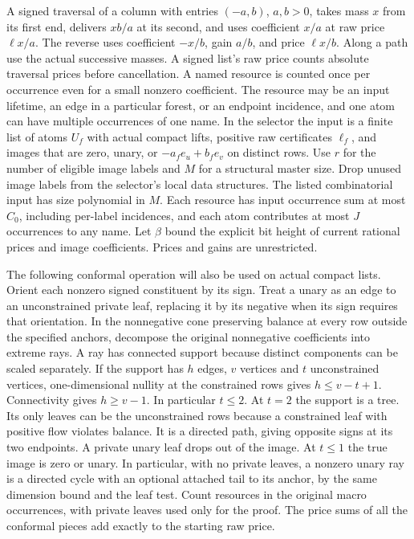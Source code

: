 \documentclass[11pt]{article}
\begin{document}
A signed traversal of a column with entries \((-a,b)\), \(a,b>0\), takes mass \(x\) from its first end, delivers \(xb/a\) at its second, and uses coefficient \(x/a\) at raw price \(\ell x/a\). The reverse uses coefficient \(-x/b\), gain \(a/b\), and price \(\ell x/b\). Along a path use the actual successive masses. A signed list's raw price counts absolute traversal prices before cancellation. A named resource is counted once per occurrence even for a small nonzero coefficient. The resource may be an input lifetime, an edge in a particular forest, or an endpoint incidence, and one atom can have multiple occurrences of one name. In the selector the input is a finite list of atoms \(U_f\) with actual compact lifts, positive raw certificates \(\ell_f\), and images that are zero, unary, or \(-a_fe_u+b_fe_v\) on distinct rows. Use \(r\) for the number of eligible image labels and \(M\) for a structural master size. Drop unused image labels from the selector's local data structures. The listed combinatorial input has size polynomial in \(M\). Each resource has input occurrence sum at most \(C_0\), including per-label incidences, and each atom contributes at most \(J\) occurrences to any name. Let \(\beta\) bound the explicit bit height of current rational prices and image coefficients. Prices and gains are unrestricted.

The following conformal operation will also be used on actual compact lists. Orient each nonzero signed constituent by its sign. Treat a unary as an edge to an unconstrained private leaf, replacing it by its negative when its sign requires that orientation. In the nonnegative cone preserving balance at every row outside the specified anchors, decompose the original nonnegative coefficients into extreme rays. A ray has connected support because distinct components can be scaled separately. If the support has \(h\) edges, \(v\) vertices and \(t\) unconstrained vertices, one-dimensional nullity at the constrained rows gives \(h\le v-t+1\). Connectivity gives \(h\ge v-1\). In particular \(t\le2\). At \(t=2\) the support is a tree. Its only leaves can be the unconstrained rows because a constrained leaf with positive flow violates balance. It is a directed path, giving opposite signs at its two endpoints. A private unary leaf drops out of the image. At \(t\le1\) the true image is zero or unary. In particular, with no private leaves, a nonzero unary ray is a directed cycle with an optional attached tail to its anchor, by the same dimension bound and the leaf test. Count resources in the original macro occurrences, with private leaves used only for the proof. The price sums of all the conformal pieces add exactly to the starting raw price.
\end{document}
